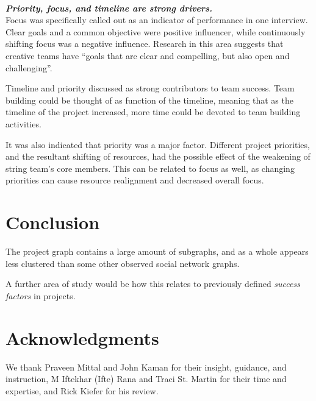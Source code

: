 \documentclass{proc}
\begin{document}
\noindent\\\textit{\textbf{Priority, focus, and timeline are strong drivers.}}\\
Focus was specifically called out as an indicator of performance in one interview. Clear goals and a common objective were positive influencer, while continuously shifting focus was a negative influence. Research in this area suggests that creative teams have ``goals that are clear and compelling, but also open and challenging''\cite{isaksen2002climate}.

Timeline and priority discussed as strong contributors to team success. Team building could be thought of as function of the timeline, meaning that as the timeline of the project increased, more time could be devoted to team building activities.

It was also indicated that priority was a major factor. Different project priorities, and the resultant shifting of resources, had the possible effect of the weakening of string team's core members. This can be related to focus as well, as changing priorities can cause resource realignment and decreased overall focus.

\section{Conclusion}
The project graph contains a large amount of subgraphs, and as a whole appears less clustered than some other observed social network graphs\cite{madey2002open}.

A further area of study would be how this relates to previously defined \textit{success factors} in projects\cite{cooke2002real}.


\section{Acknowledgments}
We thank Praveen Mittal and John Kaman for their insight, guidance, and instruction, M Iftekhar (Ifte) Rana and Traci St. Martin for their time and expertise, and Rick Kiefer for his review.






\end{document}
